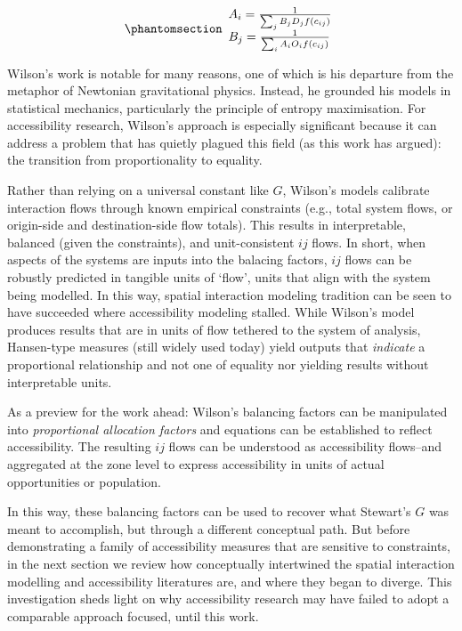 \documentclass[
  10pt,
  letterpaper,
]{article}
\begin{document}
\begin{equation}\phantomsection\label{eq-doubly-constrained-balancing-factors}{
\begin{array}{l}
A_i = \frac{1}{\sum_j B_j D_j f(c_{ij})}\\
B_j = \frac{1}{\sum_i A_i O_i f(c_{ij})}
\end{array}
}\end{equation}

Wilson's work is notable for many reasons, one of which is his departure
from the metaphor of Newtonian gravitational physics. Instead, he
grounded his models in statistical mechanics, particularly the principle
of entropy maximisation. For accessibility research, Wilson's approach
is especially significant because it can address a problem that has
quietly plagued this field (as this work has argued): the transition
from proportionality to equality.

Rather than relying on a universal constant like \(G\), Wilson's models
calibrate interaction flows through known empirical constraints (e.g.,
total system flows, or origin-side and destination-side flow totals).
This results in interpretable, balanced (given the constraints), and
unit-consistent \(ij\) flows. In short, when aspects of the systems are
inputs into the balacing factors, \(ij\) flows can be robustly predicted
in tangible units of `flow', units that align with the system being
modelled. In this way, spatial interaction modeling tradition can be
seen to have succeeded where accessibility modeling stalled. While
Wilson's model produces results that are in units of flow tethered to
the system of analysis, Hansen-type measures (still widely used today)
yield outputs that \emph{indicate} a proportional relationship and not
one of equality nor yielding results without interpretable units.

As a preview for the work ahead: Wilson's balancing factors can be
manipulated into \emph{proportional allocation factors} and equations
can be established to reflect accessibility. The resulting \(ij\) flows
can be understood as accessibility flows--and aggregated at the zone
level to express accessibility in units of actual opportunities or
population.

In this way, these balancing factors can be used to recover what
Stewart's \(G\) was meant to accomplish, but through a different
conceptual path. But before demonstrating a family of accessibility
measures that are sensitive to constraints, in the next section we
review how conceptually intertwined the spatial interaction modelling
and accessibility literatures are, and where they began to diverge. This
investigation sheds light on why accessibility research may have failed
to adopt a comparable approach focused, until this work.
\end{document}
